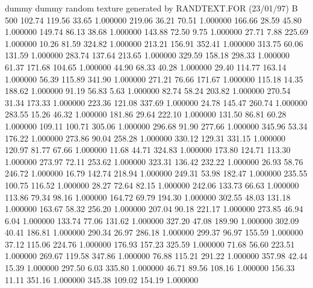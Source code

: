 dummy
dummy
random texture generated by RANDTEXT.FOR (23/01/97)
B   500
    102.74    119.56     33.65  1.000000
    219.06     36.21     70.51  1.000000
    166.66     28.59     45.80  1.000000
    149.74     86.13     38.68  1.000000
    143.88     72.50      9.75  1.000000
     27.71      7.88    225.69  1.000000
     10.26     81.59    324.82  1.000000
    213.21    156.91    352.41  1.000000
    313.75     60.06    131.59  1.000000
    283.74    137.64    213.65  1.000000
    329.59    158.18    298.33  1.000000
     61.37    171.68    104.65  1.000000
     44.90     68.33     40.28  1.000000
     29.40    114.77    163.14  1.000000
     56.39    115.89    341.90  1.000000
    271.21     76.66    171.67  1.000000
    115.18     14.35    188.62  1.000000
     91.19     56.83      5.63  1.000000
     82.74     58.24    203.82  1.000000
    270.54     31.34    173.33  1.000000
    223.36    121.08    337.69  1.000000
     24.78    145.47    260.74  1.000000
    283.55     15.26     46.32  1.000000
    181.86     29.64    222.10  1.000000
    131.50     86.81     60.28  1.000000
    109.11    100.71    305.06  1.000000
    296.68     91.90    277.66  1.000000
    345.96     53.34    176.22  1.000000
    273.86     90.04    258.28  1.000000
    330.12    129.31    331.15  1.000000
    120.97     81.77     67.66  1.000000
     11.68     44.71    324.83  1.000000
    173.80    124.71    113.30  1.000000
    273.97     72.11    253.62  1.000000
    323.31    136.42    232.22  1.000000
     26.93     58.76    246.72  1.000000
     16.79    142.74    218.94  1.000000
    249.31     53.98    182.47  1.000000
    235.55    100.75    116.52  1.000000
     28.27     72.64     82.15  1.000000
    242.06    133.73     66.63  1.000000
    113.86     79.34     98.16  1.000000
    164.72     69.79    194.30  1.000000
    302.55     48.03    131.18  1.000000
    163.67     58.32    256.20  1.000000
    207.04     90.18    221.17  1.000000
    273.85     46.94      6.04  1.000000
    133.74     77.06    131.62  1.000000
    327.20     47.08    189.90  1.000000
    302.09     40.41    186.81  1.000000
    290.34     26.97    286.18  1.000000
    299.37     96.97    155.59  1.000000
     37.12    115.06    224.76  1.000000
    176.93    157.23    325.59  1.000000
     71.68     56.60    223.51  1.000000
    269.67    119.58    347.86  1.000000
     76.88    115.21    291.22  1.000000
    357.98     42.44     15.39  1.000000
    297.50      6.03    335.80  1.000000
     46.71     89.56    108.16  1.000000
    156.33     11.11    351.16  1.000000
    345.38    109.02    154.19  1.000000
